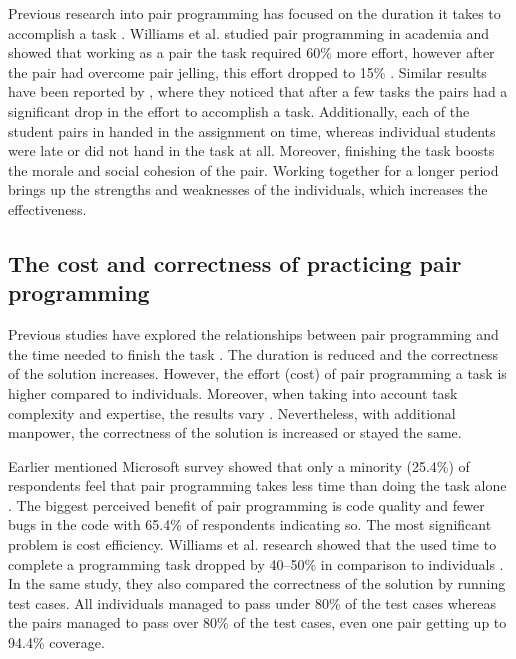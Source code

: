 \documentclass[conference]{IEEEtran}
\begin{document}
Previous research into pair programming has focused on the duration it takes to accomplish a task \cite{10.1145/2652524.2652529, Williams2000Strengthening, Hannay2009effectiveness}. Williams et al. studied pair programming in academia and showed that working as a pair the task required 60\% more effort, however after the pair had overcome pair jelling, this effort dropped to 15\% \cite{Williams2000Strengthening}. Similar results have been reported by \cite{1541842}, where they noticed that after a few tasks the pairs had a significant drop in the effort to accomplish a task. Additionally, each of the student pairs in \cite{Williams2000Strengthening} handed in the assignment on time, whereas individual students were late or did not hand in the task at all. Moreover, finishing the task boosts the morale and social cohesion of the pair. Working together for a longer period brings up the strengths and weaknesses of the individuals, which increases the effectiveness.


\subsection{The cost and correctness of practicing pair programming}

Previous studies have explored the relationships between pair programming and the time needed to finish the task \cite{10.1145/1414004.1414026, 10.5555/377517.377531, Arisholm2007Evaluating}. The duration is reduced and the correctness of the solution increases. However, the effort (cost) of pair programming a task is higher compared to individuals. Moreover, when taking into account task complexity and expertise, the results vary \cite{Arisholm2007Evaluating}. Nevertheless, with additional manpower, the correctness of the solution is increased or stayed the same.

Earlier mentioned Microsoft survey showed that only a minority (25.4\%) of respondents feel that pair programming takes less time than doing the task alone \cite{10.1145/1414004.1414026}. The biggest perceived benefit of pair programming is code quality and fewer bugs in the code with 65.4\% of respondents indicating so. The most significant problem is cost efficiency. Williams et al. research showed that the used time to complete a programming task dropped by 40--50\% in comparison to individuals \cite{Williams2000Strengthening}. In the same study, they also compared the correctness of the solution by running test cases. All individuals managed to pass under 80\% of the test cases whereas the pairs managed to pass over 80\% of the test cases, even one pair getting up to 94.4\% coverage.
\end{document}
